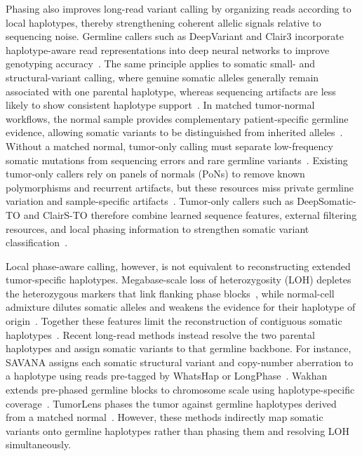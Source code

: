 \documentclass[pdflatex,sn-nature]{sn-jnl}
\begin{document}
Phasing also improves long-read variant calling by organizing reads according to local haplotypes, thereby strengthening coherent allelic signals relative to sequencing noise. Germline callers such as DeepVariant and Clair3 incorporate haplotype-aware read representations into deep neural networks to improve genotyping accuracy~\cite{poplin2018,kolesnikov2023,zheng2022}. The same principle applies to somatic small- and structural-variant calling, where genuine somatic alleles generally remain associated with one parental haplotype, whereas sequencing artifacts are less likely to show consistent haplotype support~\cite{park2024,zheng2023,keskus2025}. In matched tumor-normal workflows, the normal sample provides complementary patient-specific germline evidence, allowing somatic variants to be distinguished from inherited alleles~\cite{cibulskis2013,koboldt2012,larson2012}. Without a matched normal, tumor-only calling must separate low-frequency somatic mutations from sequencing errors and rare germline variants~\cite{sun2018,hiltemann2015,huang2018}. Existing tumor-only callers rely on panels of normals (PoNs) to remove known polymorphisms and recurrent artifacts, but these resources miss private germline variation and sample-specific artifacts~\cite{cibulskis2013}. Tumor-only callers such as DeepSomatic-TO and ClairS-TO therefore combine learned sequence features, external filtering resources, and local phasing information to strengthen somatic variant classification~\cite{park2024,chen2025}.

Local phase-aware calling, however, is not equivalent to reconstructing extended tumor-specific haplotypes. Megabase-scale loss of heterozygosity (LOH) depletes the heterozygous markers that link flanking phase blocks~\cite{nichols2020,regan2024,hwang2021}, while normal-cell admixture dilutes somatic alleles and weakens the evidence for their haplotype of origin~\cite{yadav2015,zheng2017,rhee2018}. Together these features limit the reconstruction of contiguous somatic haplotypes~\cite{foltz2024}. Recent long-read methods instead resolve the two parental haplotypes and assign somatic variants to that germline backbone. For instance, SAVANA assigns each somatic structural variant and copy-number aberration to a haplotype using reads pre-tagged by WhatsHap or LongPhase~\cite{elrick2025}. Wakhan extends pre-phased germline blocks to chromosome scale using haplotype-specific coverage~\cite{ahmad2025}. TumorLens phases the tumor against germline haplotypes derived from a matched normal~\cite{paulin2026}. However, these methods indirectly map somatic variants onto germline haplotypes rather than phasing them and resolving LOH simultaneously.
\end{document}
